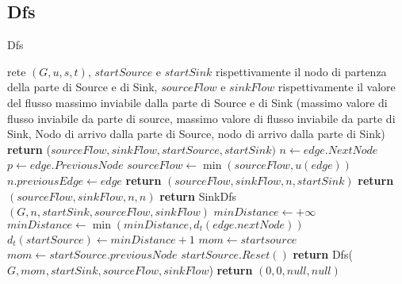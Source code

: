 \documentclass{article}
\begin{document}
\subsection{Dfs}
\begin{algorithm}
    \caption{Dfs}
    \begin{algorithmic}[1]
        \REQUIRE rete $(G,u,s,t)$, $startSource$ e $startSink$ rispettivamente il nodo di partenza della parte di Source e di Sink, $sourceFlow$ e $sinkFlow$ rispettivamente il valore del flusso massimo inviabile dalla parte di Source e di Sink
        \ENSURE (massimo valore di flusso inviabile da parte di source, massimo valore di flusso inviabile da parte di Sink, Nodo di arrivo dalla parte di Source, nodo di arrivo dalla parte di Sink)
        \STATE \textbf{return} ($sourceFlow,sinkFlow,startSource,startSink)$
            \ENDIF
            \STATE $n \leftarrow edge.NextNode$
            \STATE $p \leftarrow edge.PreviousNode$
            \STATE $sourceFlow \leftarrow \min(sourceFlow,u(edge))$
            \STATE $ n.previousEdge \leftarrow edge$ 
            \STATE \textbf{return } $(sourceFlow, sinkFlow,n,startSink)$
            \ENDIF
            \STATE \textbf{return}  $(sourceFlow, sinkFlow,n,n)$
            \ENDIF
            \STATE \textbf{return} SinkDfs$(G,n, startSink, sourceFlow, sinkFlow)$
            \ENDIF
            \ENDFOR
            \STATE $minDistance \leftarrow +\infty$
            \STATE $minDistance \leftarrow \min(minDistance, d_t(edge.nextNode))$
            \ENDIF
            \ENDFOR
            \STATE$d_t(startSource) \leftarrow minDistance+1$
            \STATE $mom \leftarrow startsource$
            \ELSE
            \STATE $mom \leftarrow startSource.previousNode$
            \ENDIF
            \STATE $startSource.Reset()$
            \STATE \textbf{return} Dfs($G,mom, startSink, sourceFlow, sinkFlow$)
            \ENDIF
            \STATE \textbf{return} $(0,0,null,null)$
    \end{algorithmic}
\end{algorithm}
\end{document}

